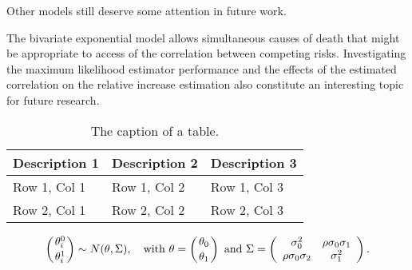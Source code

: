 \documentclass[twoside,a4paper,12pt]{article}
\theoremstyle{plain}
\theoremstyle{definition}
\begin{document}
Other models still deserve some attention in future work. 

 The bivariate exponential model \cite{Marshall1967a} allows simultaneous causes 
of death that might be appropriate to access of the correlation between 
competing risks. 
Investigating the maximum likelihood estimator performance and the effects of 
the estimated correlation on the {relative increase} estimation also constitute 
an interesting topic for future research.
                                                                                 
                                                                                 
                                                                                 
                                                                                 
                   

\nocite{*}

\begin{table}[htb]
\begin{center}
\caption{The caption of a table.}
\begin{tabular}{lll}
\hline
Description 1 & Description 2 & Description 3\\
\hline
Row 1, Col 1 & Row 1, Col 2 & Row 1, Col 3\\
Row 2, Col 1 & Row 2, Col 2 & Row 2, Col 3\\
\hline
\end{tabular}
\end{center}
\end{table}
\begin{equation}
\left({\theta^{0}_{i}}\atop{\theta^{1}_{i}}\right) \sim N(\theta,\Sigma),\quad {\mathrm{with}}\ 
{{\theta}} = \left({\theta_{0}}\atop{\theta_{1}}\right)\ {\mathrm{and}}\ \Sigma =
\left(\begin{array}{cc}
\sigma^{2}_{0} & \rho\sigma_{0}\sigma_{1}\\
\rho\sigma_{0}\sigma_{2} & \sigma^{2}_{1}
\end{array}\right).
\end{equation}
\end{document}
